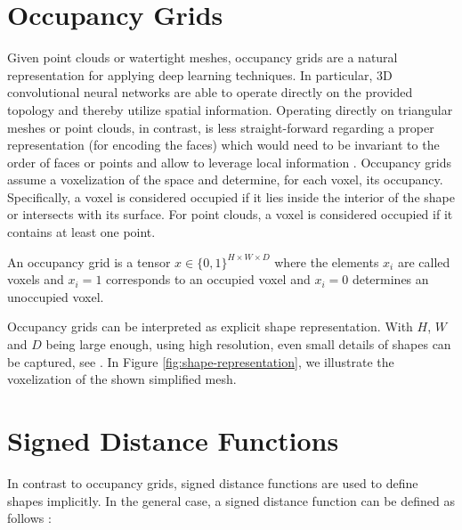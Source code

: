 \section{Occupancy Grids}
\label{sec:shape-representation-occupancy}

Given point clouds or watertight meshes, occupancy grids are a natural representation
for applying deep learning techniques. In particular, 3D convolutional neural networks
are able to operate directly on the provided topology and thereby
utilize spatial information. Operating
directly on triangular meshes or point clouds, in contrast, is less straight-forward
regarding a proper representation (\eg for encoding the faces) which would need
to be invariant to the order of faces or points \cite{GarciaGarciaLopez:2016,FanSuGuibas:2016}
and allow to leverage local information
\cite{QiYiSuGuibas:2017,GuoChen:2015,BoscainiVandergheynst:2015,BrunaLeCun:2013}.
Occupancy grids assume a voxelization of the space and
determine, for each voxel, its occupancy. Specifically, a voxel is
considered occupied if it lies inside the interior of the shape or intersects with
its surface. For point clouds, a voxel is considered occupied if it contains at
least one point.

\begin{definition}
  An occupancy grid is a tensor $x \in \{0,1\}^{H \times W \times D}$ where
  the elements $x_i$ are called voxels and $x_i = 1$ corresponds to an occupied
  voxel and $x_i = 0$ determines an unoccupied voxel.
\end{definition}

Occupancy grids can be interpreted as explicit shape representation. With
$H$, $W$ and $D$ being large enough, \ie using high resolution, even small details
of shapes can be captured, \eg see \cite{TatarchenkoBrox:2017}. In Figure
\ref{fig:shape-representation}, we illustrate the voxelization of the shown
simplified mesh.

\section{Signed Distance Functions}
\label{sec:shape-representation-sdf}

In contrast to occupancy grids, signed distance functions are used to define shapes
implicitly.
In the general case, a signed distance function
can be defined as follows \cite[Chapter~1]{BotschKobbelt:2010}:

